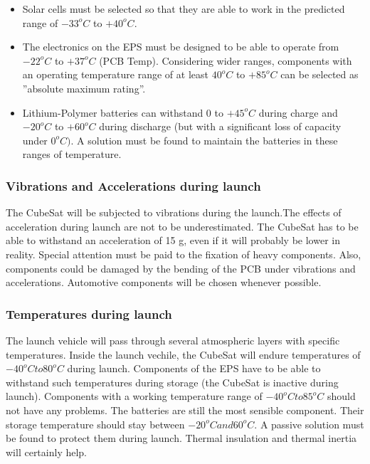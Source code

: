 \begin{itemize}
\item Solar cells must be selected so that they are able to work in the predicted range of $-33^{o}C$ to $+40^{o}C$.
\item The electronics on the EPS must be designed to be able to operate from $-22^{o}C$ to $+37^{o}C$ (PCB Temp). Considering wider ranges, components with an operating temperature range of at least  $40^{o}C$ to $+85^{o}C$ can be selected as ”absolute maximum rating”.
\item Lithium-Polymer batteries can withstand 0 to $+45^{o}C$ during charge and $-20^{o}C$ to $+60^{o}C$ during discharge (but with a significant loss of capacity under $0^{o}C)$. A solution must be found to maintain the batteries in these ranges of temperature.
\end{itemize}

\subsubsection*{Vibrations and Accelerations during launch} 

The CubeSat will be subjected to vibrations during the launch.The effects of acceleration during launch are not to be underestimated. The CubeSat has to be able to withstand an acceleration of 15 g, even if it will probably be lower in reality. Special attention must be paid to the fixation of heavy components. Also, components could be damaged by the bending of the PCB under vibrations and accelerations. Automotive components will be chosen whenever possible.

\subsubsection*{Temperatures during launch} 

The launch vehicle will pass through several atmospheric layers with specific temperatures. Inside the launch vechile, the CubeSat will endure temperatures of $-40^{o}C to 80^{o}C$ during launch. Components of the EPS have to be able to withstand such temperatures during storage (the CubeSat is inactive during launch). Components with a working temperature range of $-40^{o}C to 85^{o}C$ should not have any problems.
The batteries are still the most sensible component. Their storage temperature should stay between $-20^{o}C and 60^{o}C$. A passive solution must be found to protect them during launch. Thermal insulation and thermal inertia will certainly help.




